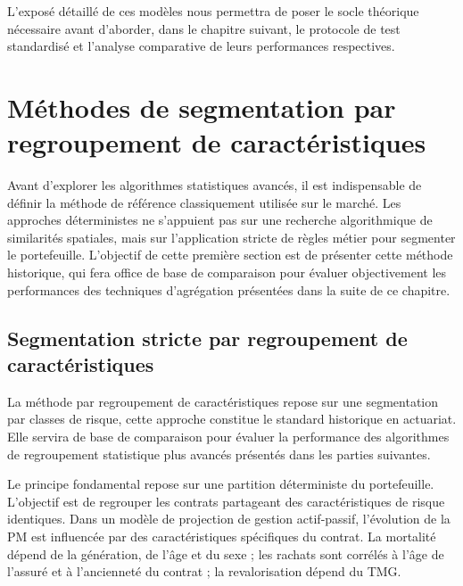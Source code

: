 L'exposé détaillé de ces modèles nous permettra de poser le socle théorique nécessaire avant d'aborder, dans le chapitre suivant, le protocole de test standardisé et l'analyse comparative de leurs performances respectives.

\section{Méthodes de segmentation par regroupement de caractéristiques}

Avant d'explorer les algorithmes statistiques avancés, il est indispensable de définir la méthode de référence classiquement utilisée sur le marché. Les approches déterministes ne s'appuient pas sur une recherche algorithmique de similarités spatiales, mais sur l'application stricte de règles métier pour segmenter le portefeuille. L'objectif de cette première section est de présenter cette méthode historique, qui fera office de base de comparaison pour évaluer objectivement les performances des techniques d'agrégation présentées dans la suite de ce chapitre.

\subsection{Segmentation stricte par regroupement de caractéristiques}

La méthode par regroupement de caractéristiques repose sur une segmentation par classes de risque, cette approche constitue le standard historique en actuariat. Elle servira de base de comparaison pour évaluer la performance des algorithmes de regroupement statistique plus avancés présentés dans les parties suivantes.

Le principe fondamental repose sur une partition déterministe du portefeuille. L'objectif est de regrouper les contrats partageant des caractéristiques de risque identiques. Dans un modèle de projection de gestion actif-passif, l'évolution de la PM est influencée par des caractéristiques spécifiques du contrat. La mortalité dépend 
de la génération, de l'âge et du sexe ; les rachats sont corrélés à l'âge de l'assuré et à l'ancienneté du contrat ; la revalorisation dépend du TMG.

